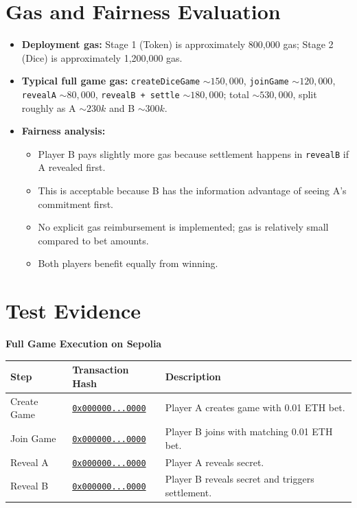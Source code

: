 \documentclass[10pt,a4paper]{article}
\newcommand{\txph}{\textcolor{red}{\href{https://sepolia.etherscan.io/tx/0x0000000000000000000000000000000000000000000000000000000000000000}{\texttt{0x000000...0000}}}}
\begin{document}
\section{Gas and Fairness Evaluation}
\begin{itemize}
  \item \textbf{Deployment gas:} Stage 1 (Token) is approximately 800,000 gas; Stage 2 (Dice) is approximately 1,200,000 gas.
  \item \textbf{Typical full game gas:} \texttt{createDiceGame} \(\sim 150{,}000\), \texttt{joinGame} \(\sim 120{,}000\), \texttt{revealA} \(\sim 80{,}000\), \texttt{revealB + settle} \(\sim 180{,}000\); total \(\sim 530{,}000\), split roughly as A \(\sim 230k\) and B \(\sim 300k\).
  \item \textbf{Fairness analysis:}
  \begin{itemize}
    \item Player B pays slightly more gas because settlement happens in \texttt{revealB} if A revealed first.
    \item This is acceptable because B has the information advantage of seeing A's commitment first.
    \item No explicit gas reimbursement is implemented; gas is relatively small compared to bet amounts.
    \item Both players benefit equally from winning.
  \end{itemize}
\end{itemize}

\section{Test Evidence}
\begingroup
\small
\noindent\textbf{Full Game Execution on Sepolia}

\smallskip
\noindent\begin{tabularx}{\textwidth}{@{}>{\raggedright\arraybackslash}p{}>{\raggedright\arraybackslash}p{}>{\raggedright\arraybackslash}p{}@{}}
\toprule
\textbf{Step} & \textbf{Transaction Hash} & \textbf{Description} \\
\midrule
Create Game & \txph & Player A creates game with 0.01 ETH bet. \\
Join Game & \txph & Player B joins with matching 0.01 ETH bet. \\
Reveal A & \txph & Player A reveals secret. \\
Reveal B & \txph & Player B reveals secret and triggers settlement. \\
\bottomrule
\end{tabularx}
\end{document}
